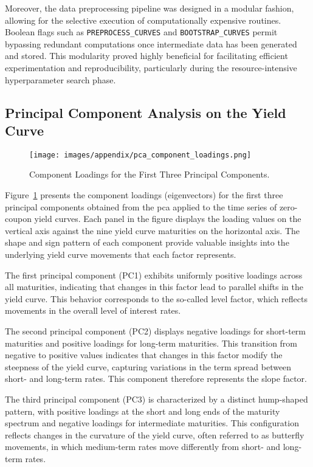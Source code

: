 Moreover, the data preprocessing pipeline was designed in a modular fashion, allowing for the selective execution of computationally expensive routines. Boolean flags such as \texttt{PREPROCESS\_CURVES} and \texttt{BOOTSTRAP\_CURVES} permit bypassing redundant computations once intermediate data has been generated and stored. This modularity proved highly beneficial for facilitating efficient experimentation and reproducibility, particularly during the resource-intensive hyperparameter search phase.

\subsection{Principal Component Analysis on the Yield Curve}
\begin{figure}[H]
	\centering
	\texttt{[image: images/appendix/pca\_component\_loadings.png]}
	\caption{Component Loadings for the First Three Principal Components.}
	\label{fig:pca_loadings}
\end{figure}

Figure~\ref{fig:pca_loadings} presents the component loadings (eigenvectors) for the first three principal components obtained from the \ac{pca} applied to the time series of zero-coupon yield curves. Each panel in the figure displays the loading values on the vertical axis against the nine yield curve maturities on the horizontal axis. The shape and sign pattern of each component provide valuable insights into the underlying yield curve movements that each factor represents.

The first principal component (PC1) exhibits uniformly positive loadings across all maturities, indicating that changes in this factor lead to parallel shifts in the yield curve. This behavior corresponds to the so-called level factor, which reflects movements in the overall level of interest rates.

The second principal component (PC2) displays negative loadings for short-term maturities and positive loadings for long-term maturities. This transition from negative to positive values indicates that changes in this factor modify the steepness of the yield curve, capturing variations in the term spread between short- and long-term rates. This component therefore represents the slope factor.

The third principal component (PC3) is characterized by a distinct hump-shaped pattern, with positive loadings at the short and long ends of the maturity spectrum and negative loadings for intermediate maturities. This configuration reflects changes in the curvature of the yield curve, often referred to as butterfly movements, in which medium-term rates move differently from short- and long-term rates.

